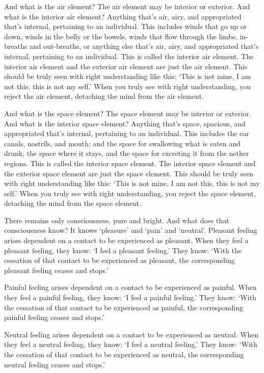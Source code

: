\documentclass[12pt,openany]{book}%
\begin{document}
And what is the air element? The air element may be interior or exterior. And what is the interior air element? Anything that’s air, airy, and appropriated that’s internal, pertaining to an individual. This includes winds that go up or down, winds in the belly or the bowels, winds that flow through the limbs, in-breaths and out-breaths, or anything else that’s air, airy, and appropriated that’s internal, pertaining to an individual. This is called the interior air element. The interior air element and the exterior air element are just the air element. This should be truly seen with right understanding like this: ‘This is not mine, I am not this, this is not my self.’ When you truly see with right understanding, you reject the air element, detaching the mind from the air element. 

And what is the space element? The space element may be interior or exterior. And what is the interior space element? Anything that’s space, spacious, and appropriated that’s internal, pertaining to an individual. This includes the ear canals, nostrils, and mouth; and the space for swallowing what is eaten and drunk, the space where it stays, and the space for excreting it from the nether regions. This is called the interior space element. The interior space element and the exterior space element are just the space element. This should be truly seen with right understanding like this: ‘This is not mine, I am not this, this is not my self.’ When you truly see with right understanding, you reject the space element, detaching the mind from the space element. 

There remains only consciousness, pure and bright. And what does that consciousness know? It knows ‘pleasure’ and ‘pain’ and ‘neutral’. Pleasant feeling arises dependent on a contact to be experienced as pleasant. When they feel a pleasant feeling, they know: ‘I feel a pleasant feeling.’ They know: ‘With the cessation of that contact to be experienced as pleasant, the corresponding pleasant feeling ceases and stops.’ 

Painful feeling arises dependent on a contact to be experienced as painful. When they feel a painful feeling, they know: ‘I feel a painful feeling.’ They know: ‘With the cessation of that contact to be experienced as painful, the corresponding painful feeling ceases and stops.’ 

Neutral feeling arises dependent on a contact to be experienced as neutral. When they feel a neutral feeling, they know: ‘I feel a neutral feeling.’ They know: ‘With the cessation of that contact to be experienced as neutral, the corresponding neutral feeling ceases and stops.’ 
\end{document}
